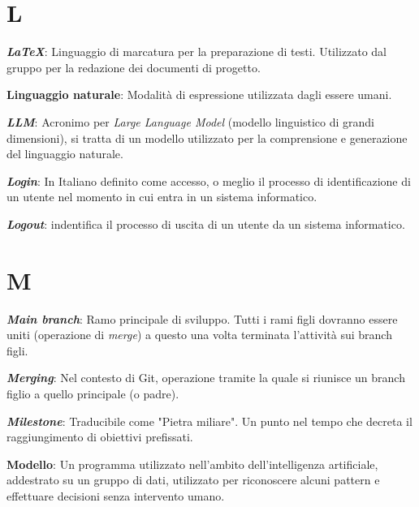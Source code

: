\documentclass[5pt]{article}
\begin{document}
\pagebreak

\section*{L}
\begin{flushleft}
	
\textbf{\textit{LaTeX}}: Linguaggio di marcatura per la preparazione di testi. Utilizzato dal gruppo per la redazione dei documenti di progetto.\newline
	
\textbf{Linguaggio naturale}: Modalità di espressione utilizzata dagli essere umani.\newline

\textbf{\textit{LLM}}: Acronimo per \textit{Large Language Model} (modello linguistico di grandi dimensioni), si tratta di un modello utilizzato per la comprensione e generazione del linguaggio naturale.\newline

\textbf{\textit{Login}}: In Italiano definito come accesso, o meglio il processo di identificazione di un utente nel momento in cui entra in un sistema informatico. \newline

\textbf{\textit{Logout}}: indentifica il processo di uscita di un utente da un sistema informatico.

\end{flushleft}

\pagebreak

\section*{M}
\begin{flushleft}
	
\textbf{\textit{Main branch}}: Ramo principale di sviluppo. Tutti i rami figli dovranno essere uniti (operazione di \textit{merge}) a questo una volta terminata l'attività sui branch figli.\newline

\textbf{\textit{Merging}}: Nel contesto di Git, operazione tramite la quale si riunisce un branch figlio a quello principale (o padre).\newline

\textbf{\textit{Milestone}}: Traducibile come "Pietra miliare". Un punto nel tempo che decreta il raggiungimento di obiettivi prefissati.\newline
	
\textbf{Modello}: Un programma utilizzato nell'ambito dell'intelligenza artificiale, addestrato su un gruppo di dati, utilizzato per riconoscere alcuni pattern e effettuare decisioni senza intervento umano.

\end{flushleft}
\end{document}
